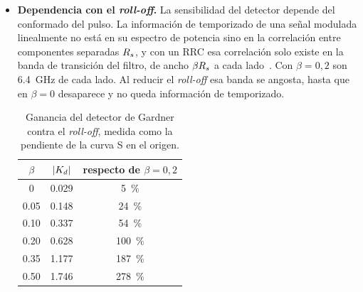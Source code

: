 \begin{itemize}
La \cref{fig:gardner-scurve} muestra el error medio del detector en funci\'on
del desfasaje de muestreo. Como se ve en el panel~(a), la curva es
peri\'odica con per\'iodo $T = 1/\Rs = \SI{31.25}{\pico\second}$, es decir que
el detector completa un ciclo entero por cada s\'imbolo que se corre el
instante de muestreo.

La consecuencia es que el punto de enganche no es \'unico. El error se anula
cada $T/2$, alternando el signo de la pendiente. Los cruces con pendiente de
un signo son puntos de equilibrio estable, porque ante una perturbaci\'on el
error realimentado empuja al lazo de vuelta hacia ellos, y los intermedios son
inestables por la raz\'on opuesta. Los estables est\'an separados $T$ entre
s\'i y el detector entrega el mismo error en todos, de modo que el lazo no
dispone de informaci\'on para distinguirlos. Son todos v\'alidos y difieren en
un s\'imbolo entero.

Eso define un intervalo de captura de $\pm T/2$ alrededor de cada punto de
enganche, que es el \'area sombreada de la figura. Si una perturbaci\'on
desplaza al lazo m\'as all\'a de esa franja antes de que alcance a corregirla,
el lazo converge al punto de enganche vecino y la salida queda corrida un
s\'imbolo entero. Cu\'an r\'apido puede el lazo absorber esa perturbaci\'on lo
determina $B_L$.

\item \textbf{Dependencia con el \emph{roll-off}.} La sensibilidad del
detector depende del conformado del pulso. La informaci\'on de temporizado de
una se\~nal modulada linealmente no est\'a en su espectro de potencia sino en
la correlaci\'on entre componentes separadas $R_{s}$, y con un RRC esa
correlaci\'on solo existe en la banda de transici\'on del filtro, de ancho
$\beta R_{s}$ a cada lado~\cite{franks1980}. Con $\beta = 0{,}2$ son
\SI{6.4}{\giga\hertz} de cada lado. Al reducir el \emph{roll-off} esa banda se
angosta, hasta que en $\beta = 0$ desaparece y no queda informaci\'on de
temporizado.

\begin{table}[htbp]
  \centering
  \begin{tabular}{ccc}
    \toprule
    $\beta$ & $\left\lvert K_d \right\rvert$ & respecto de $\beta = 0{,}2$ \\
    \midrule
    \num{0}    & \num{0.029} & \SI{5}{\percent} \\
    \num{0.05} & \num{0.148} & \SI{24}{\percent} \\
    \num{0.10} & \num{0.337} & \SI{54}{\percent} \\
    \num{0.20} & \num{0.628} & \SI{100}{\percent} \\
    \num{0.35} & \num{1.177} & \SI{187}{\percent} \\
    \num{0.50} & \num{1.746} & \SI{278}{\percent} \\
    \bottomrule
  \end{tabular}
  \caption[Ganancia del detector de Gardner contra el \emph{roll-off}]{%
           Ganancia del detector de Gardner contra el \emph{roll-off},
           medida como la pendiente de la curva S en el origen.}
  \label{tab:gardner-beta}
\end{table}


\end{itemize}
